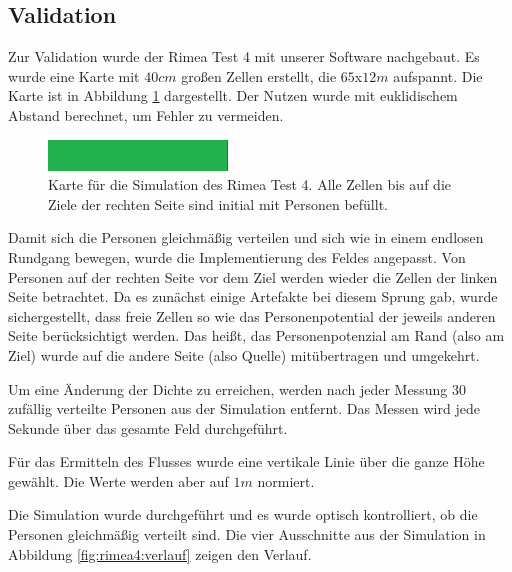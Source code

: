 \subsection{Validation}

Zur Validation wurde der Rimea Test 4 mit unserer Software nachgebaut. Es wurde eine Karte mit $40cm$ großen Zellen erstellt, die $65$x$12m$ aufspannt.
Die Karte ist in Abbildung \ref{fig:rimea4:map} dargestellt. Der Nutzen wurde mit euklidischem Abstand berechnet, um Fehler zu vermeiden.

\begin{figure}
	\centering
	\includegraphics[width=0.7\linewidth]{abbildungen/fundamentaldiagramm/map}
	\caption{Karte für die Simulation des Rimea Test 4. Alle Zellen bis auf die Ziele der rechten Seite sind initial mit Personen befüllt.}
	\label{fig:rimea4:map}
\end{figure}

Damit sich die Personen gleichmäßig verteilen und sich wie in einem endlosen Rundgang bewegen, wurde die Implementierung des Feldes angepasst. Von Personen auf der rechten Seite vor dem Ziel werden wieder die Zellen der linken Seite betrachtet. Da es zunächst einige Artefakte bei diesem Sprung gab, wurde sichergestellt, dass freie Zellen so wie das Personenpotential der jeweils anderen Seite berücksichtigt werden. Das heißt, das Personenpotenzial am Rand (also am Ziel) wurde auf die andere Seite (also Quelle) mitübertragen und umgekehrt.

Um eine Änderung der Dichte zu erreichen, werden nach jeder Messung 30 zufällig verteilte Personen aus der Simulation entfernt. Das Messen wird jede Sekunde über das gesamte Feld durchgeführt.

Für das Ermitteln des Flusses wurde eine vertikale Linie über die ganze Höhe gewählt. Die Werte werden aber auf $1m$ normiert.

Die Simulation wurde durchgeführt und es wurde optisch kontrolliert, ob die Personen gleichmäßig verteilt sind. Die vier Ausschnitte aus der Simulation in Abbildung \ref{fig:rimea4:verlauf} zeigen den Verlauf.

